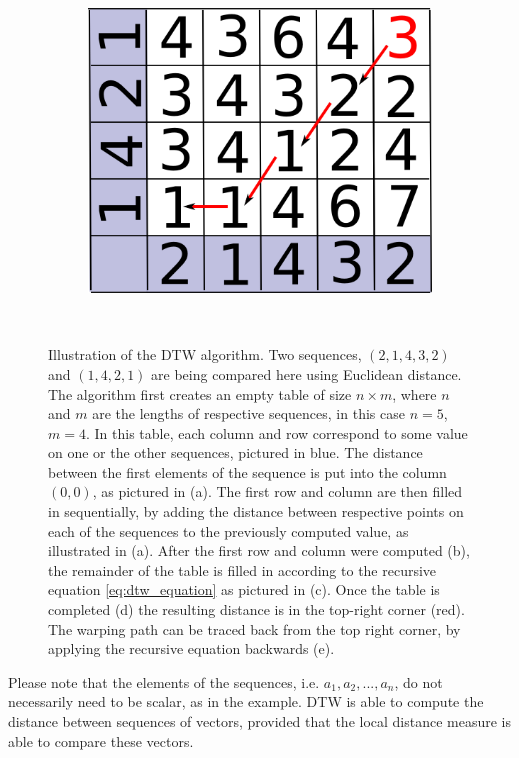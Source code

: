 \documentclass[parskip]{cs4rep}
\begin{document}
\begin{figure}
\begin{subfigure}[b]{0.3\textwidth}
       \includegraphics[width=\textwidth]{figures/DTW/worked-out/step-5.png}
       \caption{}
       \label{fig:DTW:example:5}
   \end{subfigure}
   ~
   \caption{Illustration of the DTW algorithm. Two sequences, $(2,1,4,3,2)$ and $(1,4,2,1)$ are being compared here using Euclidean distance. The algorithm first creates an empty table of size $n \times m$, where $n$ and $m$ are the lengths of respective sequences, in this case $n=5$, $m=4$. In this table, each column and row correspond to some value on one or the other sequences, pictured in blue.
The distance between the first elements of the sequence is put into the column $(0,0)$, as pictured in (a). The first row and column are then filled in sequentially, by adding the distance between respective points on each of the sequences to the previously computed value, as illustrated in (a). After the first row and column were computed (b), the remainder of the table is filled in according to the recursive equation \ref{eq:dtw_equation} as pictured in (c). Once the table is completed (d) the resulting distance is in the top-right corner (red). The warping path can be traced back from the top right corner, by applying the recursive equation backwards (e).}
   
   \label{fig:DTW:example}
\end{figure}


Please note that the elements of the sequences, i.e. $a_1, a_2, ..., a_n$, do not necessarily need to be scalar, as in the example. DTW is able to compute the distance between sequences of vectors, provided that the local distance measure is able to compare these vectors. 
\end{document}
